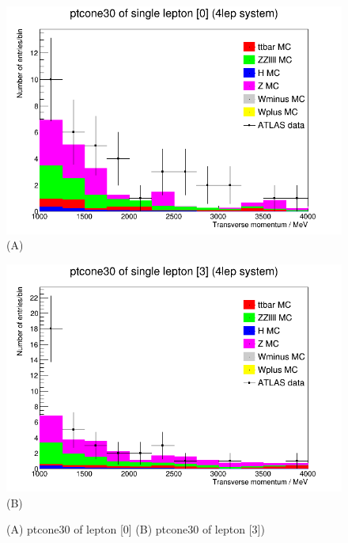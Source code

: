 \begin{figure}[h!]
    \centering
    \begin{minipage}{0.5\textwidth}
        \centering
        \includegraphics[width=\linewidth]{plots/06-03-2021/07-32_06-03-21.png}
        (A)
    \end{minipage}\hfill
    \begin{minipage}{0.5\textwidth}
        \centering
        \includegraphics[width=\linewidth]{plots/06-03-2021/08-31_06-03-21.png}
        (B)
    \end{minipage}
    \caption{(A) ptcone30 of lepton [0] (B) ptcone30 of lepton [3])}
    \label{fig:07-32_06-03-21}
\end{figure}

